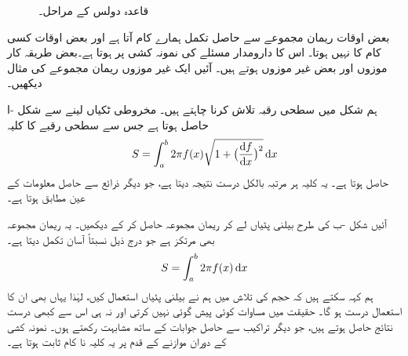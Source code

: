 \begin{figure}
\begin{subfigure}{0.3\textwidth}
\caption{}
\end{subfigure}\hfill
\begin{subfigure}{0.3\textwidth}
\centering
{}
\caption{}
\end{subfigure}
\caption{قاعدہ دولس کے مراحل۔}
\label{شکل_تکمل_استعمال_مسئلہ_دوسل}
\end{figure}

بعض اوقات ریمان مجموعے  سے حاصل تکمل ہمارے  کام آتا ہے اور بعض اوقات کسی کام کا نہیں ہوتا۔ اس کا دارومدار مسئلے کی نمونہ کشی پر ہوتا ہے۔بعض طریقہ کار موزوں اور بعض غیر موزوں ہوتے ہیں۔ آئیں ایک غیر موزوں ریمان مجموعے کی مثال دیکھیں۔

ہم شکل  میں سطحی رقبہ تلاش کرنا چاہتے ہیں۔ مخروطی ٹکیاں لینے سے شکل -ا حاصل ہوتا ہے جس سے  سطحی رقبے کا کلیہ
\begin{align}
S=\int_a^b 2\pi f(x)\sqrt{1+\big(\frac{\dif f}{\dif x}\big)^2}\dif x
\end{align} 
حاصل ہوتا ہے۔ یہ کلیہ  ہر  مرتبہ  بالکل درست نتیجہ دیتا ہے،  جو دیگر ذرائع سے حاصل معلومات کے عین مطابق ہوتا ہے۔

آئیں شکل -ب کی طرح بیلنی پٹیاں لے کر ریمان مجموعہ حاصل کر کے دیکھیں۔ یہ ریمان مجموعہ بھی مرتکز ہے جو درج ذیل نسبتاً آسان تکمل دیتا ہے۔
\begin{align}\label{مساوات_تکمل_استعمال_غلط_کلیہ}
S=\int_a^b 2\pi f(x)\dif x
\end{align}
ہم کہہ سکتے ہیں کہ حجم کی تلاش میں ہم نے بیلنی پٹیاں استعمال کیں،  لہٰذا یہاں بھی ان کا استعمال درست ہو گا۔ حقیقت میں  مساوات  کوئی پیش گوئی نہیں کرتی اور نہ  ہی اس سے کبھی درست نتائج حاصل ہوتے ہیں، جو دیگر تراکیب سے حاصل جوابات کے ساتھ مشابہت رکھتے ہوں۔ نمونہ کشی کے دوران موازنے  کے قدم پر یہ کلیہ نا کام ثابت ہوتا ہے۔

